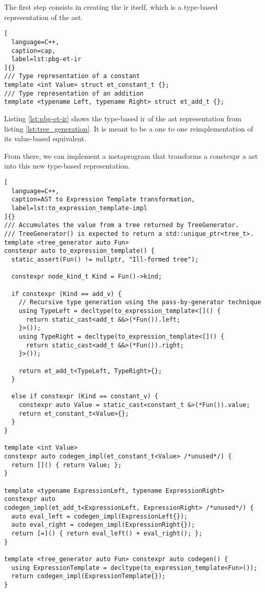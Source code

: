 \documentclass[../main]{subfiles}
\begin{document}
The first step consists in creating the \gls{ir} itself, which is a type-based
representation of the \gls{ast}.

\begin{lstlisting}[
  language=C++,
  caption=cap,
  label=lst:pbg-et-ir
]{}
/// Type representation of a constant
template <int Value> struct et_constant_t {};
/// Type representation of an addition
template <typename Left, typename Right> struct et_add_t {};
\end{lstlisting}


Listing \ref{lst:pbg-et-ir} shows the type-based \gls{ir} of the \gls{ast}
representation from listing \ref{lst:tree_generation}. It is meant to be
a one to one reimplementation of its value-based equivalent.

From there, we can implement a metaprogram that transforms a \gls{constexpr}
a \gls{ast} into this new type-based representation.

\begin{lstlisting}[
  language=C++,
  caption=AST to Expression Template transformation,
  label=lst:to_expression_template-impl
]{}
/// Accumulates the value from a tree returned by TreeGenerator.
/// TreeGenerator() is expected to return a std::unique_ptr<tree_t>.
template <tree_generator auto Fun>
constexpr auto to_expression_template() {
  static_assert(Fun() != nullptr, "Ill-formed tree");

  constexpr node_kind_t Kind = Fun()->kind;

  if constexpr (Kind == add_v) {
    // Recursive type generation using the pass-by-generator technique
    using TypeLeft = decltype(to_expression_template<[]() {
      return static_cast<add_t &&>(*Fun()).left;
    }>());
    using TypeRight = decltype(to_expression_template<[]() {
      return static_cast<add_t &&>(*Fun()).right;
    }>());

    return et_add_t<TypeLeft, TypeRight>{};
  }

  else if constexpr (Kind == constant_v) {
    constexpr auto Value = static_cast<constant_t &>(*Fun()).value;
    return et_constant_t<Value>{};
  }
}

template <int Value>
constexpr auto codegen_impl(et_constant_t<Value> /*unused*/) {
  return []() { return Value; };
}

template <typename ExpressionLeft, typename ExpressionRight>
constexpr auto
codegen_impl(et_add_t<ExpressionLeft, ExpressionRight> /*unused*/) {
  auto eval_left = codegen_impl(ExpressionLeft{});
  auto eval_right = codegen_impl(ExpressionRight{});
  return [=]() { return eval_left() + eval_right(); };
}

template <tree_generator auto Fun> constexpr auto codegen() {
  using ExpressionTemplate = decltype(to_expression_template<Fun>());
  return codegen_impl(ExpressionTemplate{});
}
\end{lstlisting}
\end{document}
